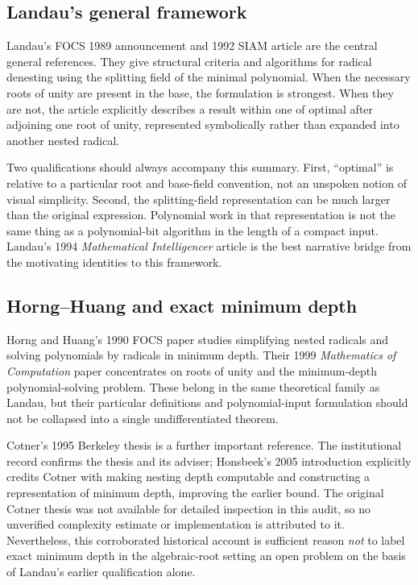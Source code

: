 \documentclass[11pt,a4paper]{article}
\theoremstyle{definition}
\theoremstyle{remark}
\numberwithin{equation}{section}
\begin{document}
\subsection{Landau's general framework}

Landau's FOCS 1989 announcement and 1992 SIAM article are the central general references. They give structural criteria and algorithms for radical denesting using the splitting field of the minimal polynomial. When the necessary roots of unity are present in the base, the formulation is strongest. When they are not, the article explicitly describes a result within one of optimal after adjoining one root of unity, represented symbolically rather than expanded into another nested radical.\cite{landau}

Two qualifications should always accompany this summary. First, ``optimal'' is relative to a particular root and base-field convention, not an unspoken notion of visual simplicity. Second, the splitting-field representation can be much larger than the original expression. Polynomial work in that representation is not the same thing as a polynomial-bit algorithm in the length of a compact input. Landau's 1994 \emph{Mathematical Intelligencer} article is the best narrative bridge from the motivating identities to this framework.\cite{landausurvey}

\subsection{Horng--Huang and exact minimum depth}

Horng and Huang's 1990 FOCS paper studies simplifying nested radicals and solving polynomials by radicals in minimum depth. Their 1999 \emph{Mathematics of Computation} paper concentrates on roots of unity and the minimum-depth polynomial-solving problem. These belong in the same theoretical family as Landau, but their particular definitions and polynomial-input formulation should not be collapsed into a single undifferentiated theorem.\cite{horng1990,horng1999}

Cotner's 1995 Berkeley thesis is a further important reference. The institutional record confirms the thesis and its adviser; Honsbeek's 2005 introduction explicitly credits Cotner with making nesting depth computable and constructing a representation of minimum depth, improving the earlier bound. The original Cotner thesis was not available for detailed inspection in this audit, so no unverified complexity estimate or implementation is attributed to it. Nevertheless, this corroborated historical account is sufficient reason \emph{not} to label exact minimum depth in the algebraic-root setting an open problem on the basis of Landau's earlier qualification alone.\cite{cotner,honsbeek2005}
\end{document}
